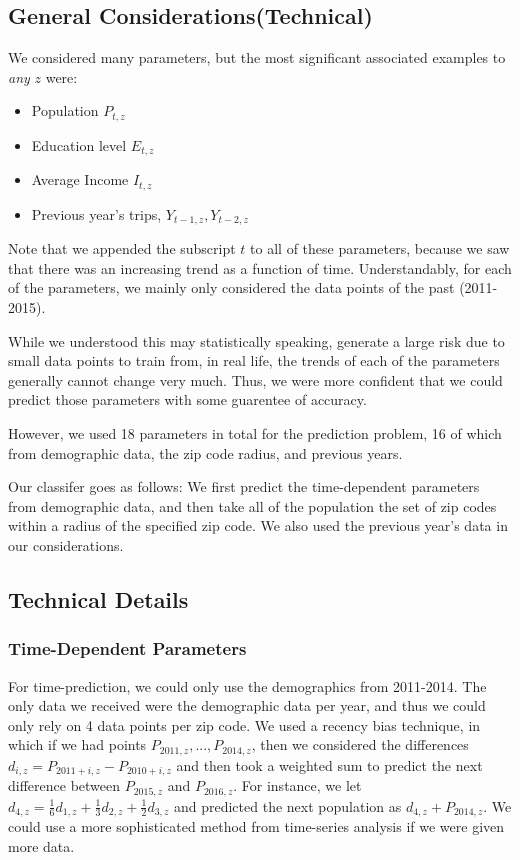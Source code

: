 \documentclass[12pt,twoside]{article}
\begin{document}
\subsection{General Considerations(Technical)} 

We considered many parameters, but the most significant associated examples to \textit{any} $z$ were: 
\begin{itemize}
\item Population $P_{t,z}$ 
\item Education level $E_{t,z}$ 
\item Average Income $I_{t,z}$
\item Previous year's trips, $Y_{t-1,z}, Y_{t-2,z}$ 
\end{itemize}   


Note that we appended the subscript $t$ to all of these parameters, because we saw that there was an increasing trend as a function of time. Understandably, for each of the parameters, we mainly only considered the data points of the past (2011- 2015). 

While we understood this may statistically speaking, generate a large risk due to small data points to train from, in real life, the trends of each of the parameters generally cannot change very much. Thus, we were more confident that we could predict those parameters with some guarentee of accuracy. 

However, we used 18 parameters in total for the prediction problem, 16 of which from demographic data, the zip code radius, and previous years.

Our classifer goes as follows: We first predict the time-dependent parameters from demographic data, and then take all of the population the set of zip codes within a radius of the specified zip code. We also used the previous year's data in our considerations.

\subsection{Technical Details }

\subsubsection{Time-Dependent Parameters}
For time-prediction, we could only use the demographics from 2011-2014. The only data we received were the demographic data per year, and thus we could only rely on 4 data points per zip code. We used a recency bias technique, in which if we had points $P_{2011,z},..., P_{2014,z}$, then we considered the differences $d_{i,z} = P_{2011+i, z} - P_{2010+i,z}$ and then took a weighted sum to predict the next difference between $P_{2015,z}$ and $P_{2016,z}$. For instance, we let $d_{4,z} = \frac{1}{6}d_{1,z} + \frac{1}{3} d_{2,z} + \frac{1}{2} d_{3,z}$ and predicted the next population as $d_{4,z}+ P_{2014,z}$. We could use a more sophisticated method from time-series analysis if we were given more data. 
\end{document}
